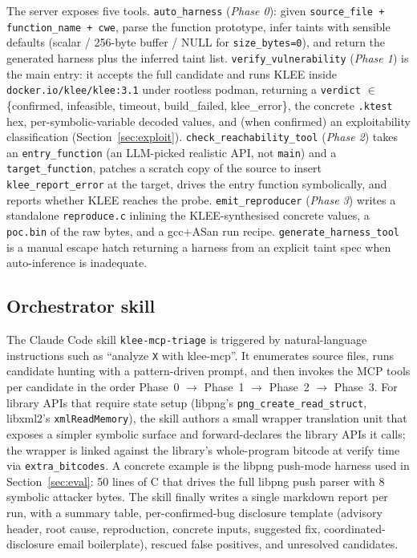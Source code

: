 \documentclass[3p,times,procedia]{elsarticle}
\begin{document}
The server exposes five tools. \texttt{auto\_harness} (\emph{Phase 0}): given \texttt{source\_file + function\_name + cwe}, parse the function prototype, infer taints with sensible defaults (scalar / 256-byte buffer / NULL for \texttt{size\_bytes=0}), and return the generated harness plus the inferred taint list. \texttt{verify\_vulnerability} (\emph{Phase 1}) is the main entry: it accepts the full candidate and runs KLEE inside \texttt{docker.io/klee/klee:3.1} under rootless podman, returning a \texttt{verdict} $\in$ \{confirmed, infeasible, timeout, build\_failed, klee\_error\}, the concrete \texttt{.ktest} hex, per-symbolic-variable decoded values, and (when confirmed) an exploitability classification (Section~\ref{sec:exploit}). \texttt{check\_reachability\_tool} (\emph{Phase 2}) takes an \texttt{entry\_function} (an LLM-picked realistic API, not \texttt{main}) and a \texttt{target\_function}, patches a scratch copy of the source to insert \texttt{klee\_report\_error} at the target, drives the entry function symbolically, and reports whether KLEE reaches the probe. \texttt{emit\_reproducer} (\emph{Phase 3}) writes a standalone \texttt{reproduce.c} inlining the KLEE-synthesised concrete values, a \texttt{poc.bin} of the raw bytes, and a gcc+ASan run recipe. \texttt{generate\_harness\_tool} is a manual escape hatch returning a harness from an explicit taint spec when auto-inference is inadequate.

\subsection{Orchestrator skill}
\label{sec:skill}

The Claude Code skill \texttt{klee-mcp-triage} is triggered by natural-language instructions such as ``analyze \texttt{X} with klee-mcp''. It enumerates source files, runs candidate hunting with a pattern-driven prompt, and then invokes the MCP tools per candidate in the order Phase~0 $\rightarrow$ Phase~1 $\rightarrow$ Phase~2 $\rightarrow$ Phase~3. For library APIs that require state setup (libpng's \texttt{png\_create\_read\_struct}, libxml2's \texttt{xmlReadMemory}), the skill authors a small wrapper translation unit that exposes a simpler symbolic surface and forward-declares the library APIs it calls; the wrapper is linked against the library's whole-program bitcode at verify time via \texttt{extra\_bitcodes}. A concrete example is the libpng push-mode harness used in Section~\ref{sec:eval}: 50 lines of C that drives the full libpng push parser with 8 symbolic attacker bytes. The skill finally writes a single markdown report per run, with a summary table, per-confirmed-bug disclosure template (advisory header, root cause, reproduction, concrete inputs, suggested fix, coordinated-disclosure email boilerplate), rescued false positives, and unresolved candidates.
\end{document}
